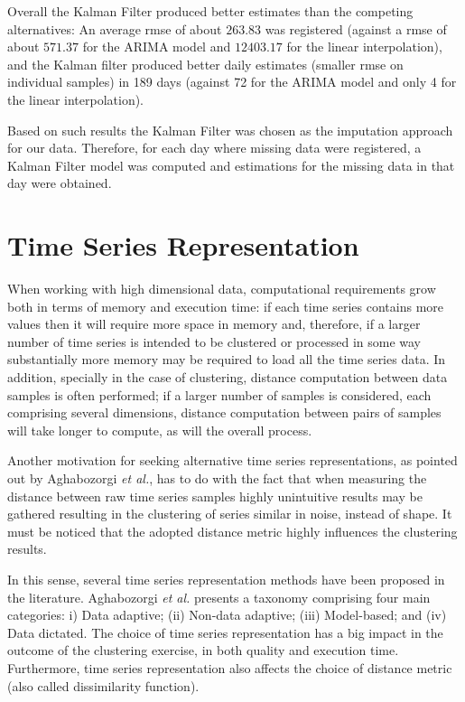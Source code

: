 \documentclass[9pt,journal,compsoc]{IEEEtran}
\begin{document}
Overall the Kalman Filter produced better estimates than the competing alternatives: An average rmse of about $263.83$ was registered (against a rmse of about $571.37$ for the ARIMA model and $12403.17$ for the linear interpolation), and the Kalman filter produced better daily estimates (smaller rmse on individual samples) in 189 days (against 72 for the ARIMA model and only 4 for the linear interpolation).

Based on such results the Kalman Filter was chosen as the imputation approach for our data. Therefore, for each day where missing data were registered, a Kalman Filter model was computed and estimations for the missing data in that day were obtained.

\section{Time Series Representation}
\label{time_series_representation}

When working with high dimensional data, computational requirements grow both in terms of memory and execution time: if each time series contains more values then it will require more space in memory and, therefore, if a larger number of time series is intended to be clustered or processed in some way substantially more memory may be required to load all the time series data. In addition, specially in the case of clustering, distance computation between data samples is often performed; if a larger number of samples is considered, each comprising several dimensions, distance computation between pairs of samples will take longer to compute, as will the overall process.

Another motivation for seeking alternative time series representations, as pointed out by Aghabozorgi \emph{et al.}\cite{aghabozorgi2015time}, has to do with the fact that when measuring the distance between raw time series samples highly unintuitive results may be gathered resulting in the clustering of series similar in noise, instead of shape. It must be noticed that the adopted distance metric highly influences the clustering results.

In this sense, several time series representation methods have been proposed in the literature. Aghabozorgi \emph{et al.} presents a taxonomy comprising four main categories: i) Data adaptive; (ii) Non-data adaptive; (iii) Model-based; and (iv) Data dictated. The choice of time series representation has a big impact in the outcome of the clustering exercise, in both quality and execution time. Furthermore, time series representation also affects the choice of distance metric (also called dissimilarity function).
\end{document}
